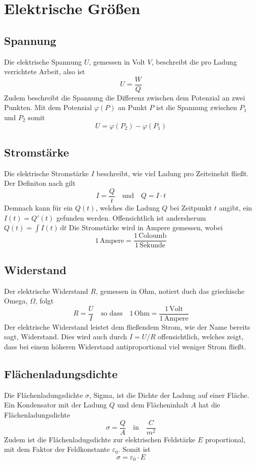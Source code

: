 \documentclass{article}
\begin{document}
 
\section{Elektrische Größen} 
 
\subsection{Spannung}
Die elektrische Spannung $U$, gemessen in Volt $V$, beschreibt die pro Ladung verrichtete Arbeit, also ist
\[
 U = \frac{W}{Q} 
\]
Zudem beschreibt die Spannung die Differenz zwischen dem Potenzial an zwei Punkten. Mit dem Potenzial $\varphi(P)$ an Punkt $P$ ist die Spannung zwischen $P_1$ und $P_2$ somit
\[
 U = \varphi(P_2) - \varphi(P_1) 
\]
 
\subsection{Stromstärke} 
Die elektrische Stromstärke $I$ beschreibt, wie viel Ladung pro Zeiteinehit fließt. Der Definiton nach gilt
\[
 I = \frac{Q}{t}
 \quad \text{und} \quad
 Q = I \cdot t 
\]
Demnach kann für ein $Q(t)$, welches die Ladung $Q$ bei Zeitpunkt $t$ angibt, ein $I(t)=Q'(t)$ gefunden werden. Offensichtlich ist andersherum $\displaystyle Q(t) = \int I(t) \,\mathrm{d}t$ 
Die Stromstärke wird in Ampere gemessen, wobei
\[
 1 \, \text{Ampere} = \frac{1 \, \text{Coloumb}}{1 \, \text{Sekunde}}
\]  
 
\subsection{Widerstand}
Der elektrische Widerstand $R$, gemessen in Ohm, notiert duch das griechische Omega, $\Omega$, folgt
\[
 R = \frac{U}{I}
 \quad \text{so dass} \quad
 1\,\text{Ohm} = \frac{1\,\text{Volt}}{1\,\text{Ampere}} 
\] 
Der elektrische Widerstand leistet dem fließendem Strom, wie der Name bereits sagt, Widerstand. Dies wird auch durch $I = U / R$ offensichtlich, welches zeigt, dass bei einem höheren Widerstand antiproportional viel weniger Strom fließt. 
 
\subsection{Flächenladungsdichte} 
Die Flächenladungsdichte $\sigma$, Sigma, ist die Dichte der Ladung auf einer Fläche. Ein Kondensator mit der Ladung $Q$ und dem Flächeninhalt $A$ hat die Flächenladungsdichte
\[
 \sigma = \frac{Q}{A}  
 \quad \text{in} \quad
 \frac{C}{m^2} 
\] 
Zudem ist die Flächenladugsdichte zur elektrischen Feldstärke $E$ proportional, mit dem Faktor der Feldkonstante $\varepsilon_0$. Somit ist
\[
 \sigma = \varepsilon_0 \cdot E 
\]
 
\end{document}
